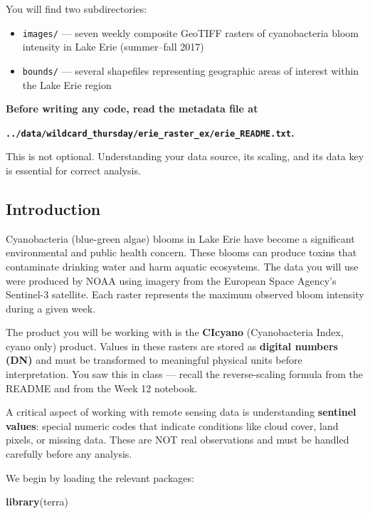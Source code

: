 \documentclass[
]{article}
\newenvironment{Shaded}{\begin{snugshade}}{\end{snugshade}}
\newcommand{\FunctionTok}[1]{\textcolor[rgb]{0.13,0.29,0.53}{\textbf{#1}}}
\newcommand{\NormalTok}[1]{#1}
\providecommand{\tightlist}{%
  \setlength{\itemsep}{0pt}\setlength{\parskip}{0pt}}
\begin{document}
You will find two subdirectories:

\begin{itemize}
\tightlist
\item
  \texttt{images/} --- seven weekly composite GeoTIFF rasters of
  cyanobacteria bloom intensity in Lake Erie (summer--fall 2017)
\item
  \texttt{bounds/} --- several shapefiles representing geographic areas
  of interest within the Lake Erie region
\end{itemize}

\textbf{Before writing any code, read the metadata file at}

\textbf{\texttt{../data/wildcard\_thursday/erie\_raster\_ex/erie\_README.txt}.}

This is not optional. Understanding your data source, its scaling, and
its data key is essential for correct analysis.

\subsection{Introduction}\label{introduction}

Cyanobacteria (blue-green algae) blooms in Lake Erie have become a
significant environmental and public health concern. These blooms can
produce toxins that contaminate drinking water and harm aquatic
ecosystems. The data you will use were produced by NOAA using imagery
from the European Space Agency's Sentinel-3 satellite. Each raster
represents the maximum observed bloom intensity during a given week.

The product you will be working with is the \textbf{CIcyano}
(Cyanobacteria Index, cyano only) product. Values in these rasters are
stored as \textbf{digital numbers (DN)} and must be transformed to
meaningful physical units before interpretation. You saw this in class
--- recall the reverse-scaling formula from the README and from the Week
12 notebook.

A critical aspect of working with remote sensing data is understanding
\textbf{sentinel values}: special numeric codes that indicate conditions
like cloud cover, land pixels, or missing data. These are NOT real
observations and must be handled carefully before any analysis.

We begin by loading the relevant packages:

\begin{Shaded}
\begin{Highlighting}[]
\FunctionTok{library}\NormalTok{(terra)}
\end{Highlighting}
\end{Shaded}
\end{document}
